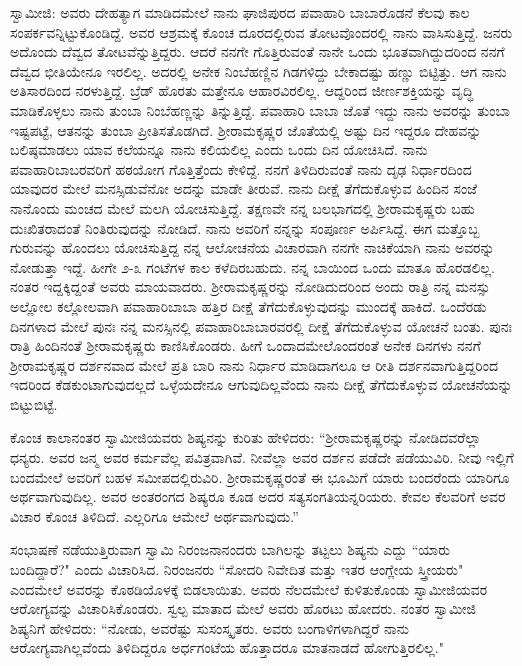 ಸ್ವಾಮೀಜಿ: ಅವರು ದೇಹತ್ಯಾಗ ಮಾಡಿದಮೇಲೆ ನಾನು ಘಾಜಿಪುರದ ಪವಾಹಾರಿ ಬಾಬಾರೊಡನೆ ಕೆಲವು ಕಾಲ ಸಂಪರ್ಕವನ್ನಿಟ್ಟುಕೊಂಡಿದ್ದೆ. ಅವರ ಆಶ್ರಮಕ್ಕೆ ಕೊಂಚ ದೂರದಲ್ಲಿರುವ ತೋಟವೊಂದರಲ್ಲಿ ನಾನು ವಾಸಿಸುತ್ತಿದ್ದೆ. ಜನರು ಅದೊಂದು ದೆವ್ವದ ತೋಟವೆನ್ನುತ್ತಿದ್ದರು. ಆದರೆ ನನಗೇ ಗೊತ್ತಿರುವಂತೆ ನಾನೇ ಒಂದು ಭೂತವಾಗಿದ್ದುದರಿಂದ ನನಗೆ ದೆವ್ವದ ಭೀತಿಯೇನೂ ಇರಲಿಲ್ಲ. ಅದರಲ್ಲಿ ಅನೇಕ ನಿಂಬೆಹಣ್ಣಿನ ಗಿಡಗಳಿದ್ದು ಬೇಕಾದಷ್ಟು ಹಣ್ಣು ಬಿಟ್ಟಿತ್ತು. ಆಗ ನಾನು ಅತಿಸಾರದಿಂದ ನರಳುತ್ತಿದ್ದೆ. ಬ್ರೆಡ್ ಹೊರತು ಮತ್ತೇನೂ ಆಹಾರವಿರಲಿಲ್ಲ. ಆದ್ದರಿಂದ ಜೀರ್ಣಶಕ್ತಿಯನ್ನು ವೃದ್ಧಿ ಮಾಡಿಕೊಳ್ಳಲು ನಾನು ತುಂಬಾ ನಿಂಬೆಹಣ್ಣನ್ನು ತಿನ್ನುತ್ತಿದ್ದೆ. ಪವಾಹಾರಿ ಬಾಬಾ ಜೊತೆ ಇದ್ದು ನಾನು ಅವರನ್ನು ತುಂಬಾ ಇಷ್ಟಪಟ್ಟೆ, ಆತನನ್ನು ತುಂಬಾ ಪ್ರೀತಿಸತೊಡಗಿದೆ. ಶ‍್ರೀರಾಮಕೃಷ್ಣರ ಜೊತೆಯಲ್ಲಿ ಅಷ್ಟು ದಿನ ಇದ್ದರೂ ದೇಹವನ್ನು ಬಲಿಷ್ಠಮಾಡಲು ಯಾವ ಕಲೆಯನ್ನೂ ನಾನು ಕಲಿಯಲಿಲ್ಲ ಎಂದು ಒಂದು ದಿನ ಯೋಚಿಸಿದೆ. ನಾನು ಪವಾಹಾರಿಬಾಬರವರಿಗೆ ಹಠಯೋಗ ಗೊತ್ತಿತ್ತೆಂದು ಕೇಳಿದ್ದೆ. ನನಗೆ ತಿಳಿದಿರುವಂತೆ ನಾನು ದೃಢ ನಿರ್ಧಾರದಿಂದ ಯಾವುದರ ಮೇಲೆ ಮನಸ್ಸಿಡುವೆನೋ ಅದನ್ನು ಮಾಡೇ ತೀರುವೆ. ನಾನು ದೀಕ್ಷೆ ತೆಗೆದುಕೊಳ್ಳುವ ಹಿಂದಿನ ಸಂಜೆ ನಾನೊಂದು ಮಂಚದ ಮೇಲೆ ಮಲಗಿ ಯೋಚಿಸುತ್ತಿದ್ದೆ. ತಕ್ಷಣವೇ ನನ್ನ ಬಲಭಾಗದಲ್ಲಿ ಶ‍್ರೀರಾಮಕೃಷ್ಣರು ಬಹು ದುಃಖಿತರಾದಂತೆ ನಿಂತಿರುವುದನ್ನು ನೋಡಿದೆ. ನಾನು ಅವರಿಗೆ ನನ್ನನ್ನು ಸಂಪೂರ್ಣ ಅರ್ಪಿಸಿದ್ದೆ. ಈಗ ಮತ್ತೊಬ್ಬ ಗುರುವನ್ನು ಹೊಂದಲು ಯೋಚಿಸುತ್ತಿದ್ದ ನನ್ನ ಆಲೋಚನೆಯ ವಿಚಾರವಾಗಿ ನನಗೇ ನಾಚಿಕೆಯಾಗಿ ನಾನು ಅವರನ್ನು ನೋಡುತ್ತಾ ಇದ್ದೆ. ಹೀಗೇ ೨-೩ ಗಂಟೆಗಳ ಕಾಲ ಕಳೆದಿರಬಹುದು. ನನ್ನ ಬಾಯಿಂದ ಒಂದು ಮಾತೂ ಹೊರಡಲಿಲ್ಲ. ನಂತರ ಇದ್ದಕ್ಕಿದ್ದಂತೆ ಅವರು ಮಾಯವಾದರು. ಶ‍್ರೀರಾಮಕೃಷ್ಣರನ್ನು ನೋಡಿದುದರಿಂದ ಅಂದು ರಾತ್ರಿ ನನ್ನ ಮನಸ್ಸು ಅಲ್ಲೋಲ ಕಲ್ಲೋಲವಾಗಿ ಪವಾಹಾರಿಬಾಬಾ ಹತ್ತಿರ ದೀಕ್ಷೆ ತೆಗೆದುಕೊಳ್ಳುವುದನ್ನು ಮುಂದಕ್ಕೆ ಹಾಕಿದೆ. ಒಂದೆರಡು ದಿನಗಳಾದ ಮೇಲೆ ಪುನಃ ನನ್ನ ಮನಸ್ಸಿನಲ್ಲಿ ಪವಾಹಾರಿಬಾಬಾರವರಲ್ಲಿ ದೀಕ್ಷೆ ತೆಗೆದುಕೊಳ್ಳುವ ಯೋಚನೆ ಬಂತು. ಪುನಃ ರಾತ್ರಿ ಹಿಂದಿನಂತೆ ಶ‍್ರೀರಾಮಕೃಷ್ಣರು ಕಾಣಿಸಿಕೊಂಡರು. ಹೀಗೆ ಒಂದಾದಮೇಲೊಂದರಂತೆ ಅನೇಕ ದಿನಗಳು ನನಗೆ ಶ‍್ರೀರಾಮಕೃಷ್ಣರ ದರ್ಶನವಾದ ಮೇಲೆ ಪ್ರತಿ ಬಾರಿ ನಾನು ನಿರ್ಧಾರ ಮಾಡಿದಾಗಲೂ ಆ ರೀತಿ ದರ್ಶನವಾಗುತ್ತಿದ್ದರಿಂದ ಇದರಿಂದ ಕೆಡಕುಂಟಾಗುವುದಲ್ಲದೆ ಒಳ್ಳೆಯದೇನೂ ಆಗುವುದಿಲ್ಲವೆಂದು ನಾನು ದೀಕ್ಷೆ ತೆಗೆದುಕೊಳ್ಳುವ ಯೋಚನೆಯನ್ನು ಬಿಟ್ಟುಬಿಟ್ಟೆ.

ಕೊಂಚ ಕಾಲಾನಂತರ ಸ್ವಾಮೀಜಿಯವರು ಶಿಷ್ಯನನ್ನು ಕುರಿತು ಹೇಳಿದರು: “ಶ‍್ರೀರಾಮಕೃಷ್ಣರನ್ನು ನೋಡಿದವರೆಲ್ಲಾ ಧನ್ಯರು. ಅವರ ಜನ್ಮ ಅವರ ಕರ್ಮವೆಲ್ಲ ಪವಿತ್ರವಾಗಿವೆ. ನೀವೆಲ್ಲಾ ಅವರ ದರ್ಶನ ಪಡೆದೇ ಪಡೆಯುವಿರಿ. ನೀವು ಇಲ್ಲಿಗೆ ಬಂದಮೇಲೆ ಅವರಿಗೆ ಬಹಳ ಸಮೀಪದಲ್ಲಿರುವಿರಿ. ಶ‍್ರೀರಾಮಕೃಷ್ಣರಂತೆ ಈ ಭೂಮಿಗೆ ಯಾರು ಬಂದರೆಂದು ಯಾರಿಗೂ ಅರ್ಥವಾಗುವುದಿಲ್ಲ. ಅವರ ಅಂತರಂಗದ ಶಿಷ್ಯರೂ ಕೂಡ ಅದರ ಸತ್ಯಸಂಗತಿಯನ್ನರಿಯರು. ಕೇವಲ ಕೆಲವರಿಗೆ ಅವರ ವಿಚಾರ ಕೊಂಚ ತಿಳಿದಿದೆ. ಎಲ್ಲರಿಗೂ ಆಮೇಲೆ ಅರ್ಥವಾಗುವುದು.”

ಸಂಭಾಷಣೆ ನಡೆಯುತ್ತಿರುವಾಗ ಸ್ವಾಮಿ ನಿರಂಜನಾನಂದರು ಬಾಗಿಲನ್ನು ತಟ್ಟಲು ಶಿಷ್ಯನು ಎದ್ದು “ಯಾರು ಬಂದಿದ್ದಾರೆ?" ಎಂದು ವಿಚಾರಿಸಿದ. ನಿರಂಜನರು “ಸೋದರಿ ನಿವೇದಿತ ಮತ್ತು ಇತರ ಆಂಗ್ಲೇಯ ಸ್ತ್ರೀಯರು" ಎಂದಮೇಲೆ ಅವರನ್ನು ಕೊಠಡಿಯೊಳಕ್ಕೆ ಬಿಡಲಾಯಿತು. ಅವರು ನೆಲದಮೇಲೆ ಕುಳಿತುಕೊಂಡು ಸ್ವಾಮೀಜಿಯವರ ಆರೋಗ್ಯವನ್ನು ವಿಚಾರಿಸಿಕೊಂಡರು. ಸ್ವಲ್ಪ ಮಾತಾದ ಮೇಲೆ ಅವರು ಹೊರಟು ಹೋದರು. ನಂತರ ಸ್ವಾಮೀಜಿ ಶಿಷ್ಯನಿಗೆ ಹೇಳಿದರು: “ನೋಡು, ಅವರೆಷ್ಟು ಸುಸಂಸ್ಕೃತರು. ಅವರು ಬಂಗಾಳಿಗಳಾಗಿದ್ದರೆ ನಾನು ಆರೋಗ್ಯವಾಗಿಲ್ಲವೆಂದು ತಿಳಿದಿದ್ದರೂ ಅರ್ಧಗಂಟೆಯ ಹೊತ್ತಾದರೂ ಮಾತನಾಡದೆ ಹೋಗುತ್ತಿರಲಿಲ್ಲ."

